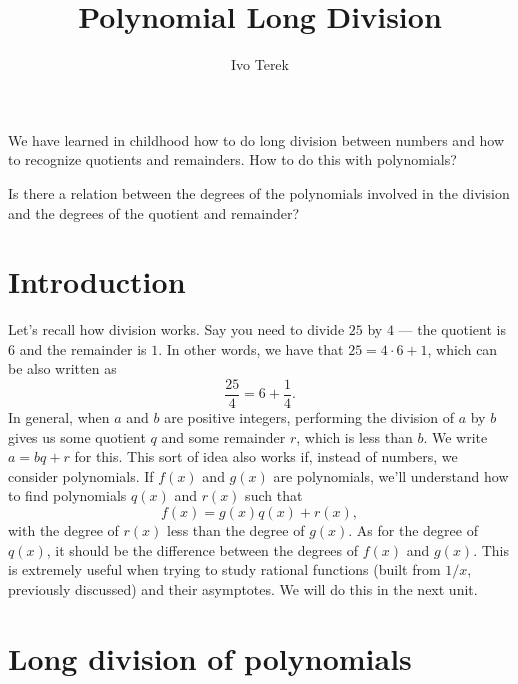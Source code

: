 \documentclass{ximera}
\author{Ivo Terek}
\title{Polynomial Long Division}
\begin{document}
\begin{abstract}
\end{abstract}
\maketitle


\begin{motivatingQuestions}
\item We have learned in childhood how to do long division between numbers and how to recognize quotients and remainders. How to do this with polynomials?
\item Is there a relation between the degrees of the polynomials involved in the division and the degrees of the quotient and remainder?
\end{motivatingQuestions}



\section{Introduction}

Let's recall how division works. Say you need to divide $25$ by $4$ --- the quotient is $6$ and the remainder is $1$. In other words, we have that $25 = 4\cdot 6 + 1$, which can be also written as \[  \frac{25}{4} = 6+\frac{1}{4}. \]In general, when $a$ and $b$ are positive integers, performing the division of $a$ by $b$ gives us some quotient $q$ and some remainder $r$, which is less than $b$. We write $a = bq+r$ for this. This sort of idea also works if, instead of numbers, we consider polynomials. If $f(x)$ and $g(x)$ are polynomials, we'll understand how to find polynomials $q(x)$ and $r(x)$ such that \[  f(x) = g(x)q(x)+r(x),  \]with the degree of $r(x)$ less than the degree of $g(x)$. As for the degree of $q(x)$, it should be the difference between the degrees of $f(x)$ and $g(x)$. This is extremely useful when trying to study rational functions (built from $1/x$, previously discussed) and their asymptotes. We will do this in the next unit.

\section{Long division of polynomials}
\end{document}
